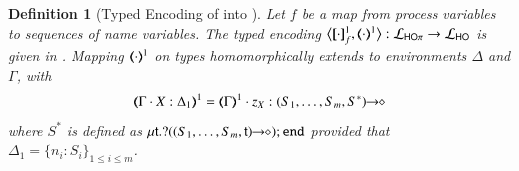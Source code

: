 \documentclass[preprint,11pt]{elsarticle}
\newtheorem{definition}{Definition}[section]
\newtheorem{proposition}{Proposition}[section]
\begin{document}
{





\begin{definition}[Typed Encoding of \HOp into \HO]
\label{d:enc:hopitoho}
Let $f$ be a map from process variables to sequences of name variables.
%
The typed encoding 
$\enco{\map{\cdot}^{1}_f, \mapt{\cdot}^{1} %
}: \tyl{L}_{\HOp} \to \tyl{L}_{\HO}$ is given in 
. 
Mapping $(\!\!\langle\cdot\rangle\!\!)^{1}$ on types homomorphically extends to 
environments $\Delta$
and
$\Gamma$, with
$$
\tmap{\Gamma \cat \varp{X}:\Delta_1}{1}  =  \tmap{\Gamma}{1} \cat z_X:\shot{(S_1,\ldots,S_m,S^*)}
$$ 
where  
$S^*$ is defined as $\mu\mathsf{t}.? ((S_1,\ldots,S_m,\mathsf{t})\!\! \rightarrow\!\! \diamond) ; \mathtt{end}$
provided that $\Delta_1 = \{n_i:S_i\}_{1\leq i\leq m}$.
\end{definition}

}
\end{document}
